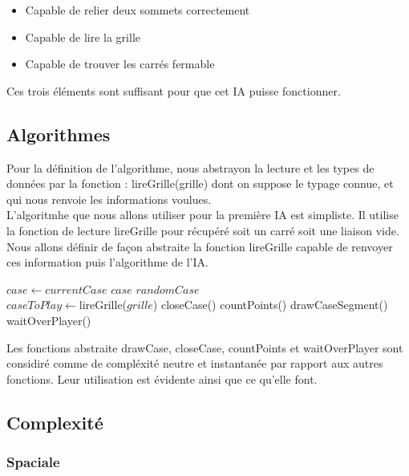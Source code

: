 \documentclass[a4paper,12pt]{report}
\begin{document}
\begin{itemize}
 \item Capable de relier deux sommets correctement
 \item Capable de lire la grille
 \item Capable de trouver les carr\'es fermable
\end{itemize}

Ces trois \'el\'ements sont suffisant pour que cet IA puisse fonctionner.

\subsection{Algorithmes}

Pour la d\'efinition de l'algorithme, nous abstrayon la lecture et les types de donn\'ees par la fonction : lireGrille(grille) dont on suppose le typage connue, et qui nous renvoie les informations voulues. \\
L'algoritmhe que nous allons utiliser pour la premi\`ere IA est simpliste. Il utilise la fonction de lecture lireGrille pour r\'ecup\'er\'e soit un carr\'e soit une liaison vide. Nous allons d\'efinir de fa\c{c}on abstraite la fonction lireGrille capable de renvoyer ces information puis l'algorithme de l'IA. \\
\begin{algorithmic}
	\State $case \gets currentCase$
			\State \Return $case$
		\Else
				\State \Return $randomCase$
			\EndIf
		\EndIf
	\EndFor
\EndFunction
\\
		\State $caseToPlay\gets$lireGrille($grille$)
			\State closeCase()
			\State countPoints()
		\Else
			\State drawCaseSegment()
		\EndIf
		\State waitOverPlayer()
	\EndWhile
\EndFunction
\end{algorithmic}
Les fonctions abstraite drawCase, closeCase, countPoints et waitOverPlayer sont considir\'e comme de compl\'exit\'e neutre et instantan\'ee par rapport aux autres fonctions. Leur utilisation est \'evidente ainsi que ce qu'elle font.

\subsection{Complexit\'e}

\subsubsection{Spaciale}
\end{document}
